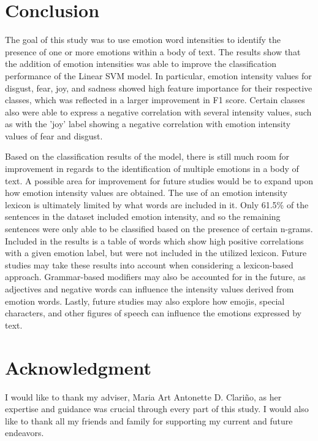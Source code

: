 \documentclass[journal]{./IEEE/IEEEtran}
\begin{document}
\section{Conclusion}
The goal of this study was to use emotion word intensities to identify the presence of one or more emotions within a body of text. The results show that the addition of emotion intensities was able to improve the classification performance of the Linear SVM model. In particular, emotion intensity values for disgust, fear, joy, and sadness showed high feature importance for their respective classes, which was reflected in a larger improvement in F1 score. Certain classes also were able to express a negative correlation with several intensity values, such as with the 'joy' label showing a negative correlation with emotion intensity values of fear and disgust.

Based on the classification results of the model, there is still much room for improvement in regards to the identification of multiple emotions in a body of text. A possible area for improvement for future studies would be to expand upon how emotion intensity values are obtained. The use of an emotion intensity lexicon is ultimately limited by what words are included in it. Only 61.5\% of the sentences in the dataset included emotion intensity, and so the remaining sentences were only able to be classified based on the presence of certain n-grams. Included in the results is a table of words which show high positive correlations with a given emotion label, but were not included in the utilized lexicon. Future studies may take these results into account when considering a lexicon-based approach. Grammar-based modifiers may also be accounted for in the future, as adjectives and negative words can influence the intensity values derived from emotion words. Lastly, future studies may also explore how emojis, special characters, and other figures of speech can influence the emotions expressed by text.

\section*{Acknowledgment}
I would like to thank my adviser, Maria Art Antonette D. Clariño, as her expertise and guidance was crucial through every part of this study. I would also like to thank all my friends and family for supporting my current and future endeavors.



\end{document}
